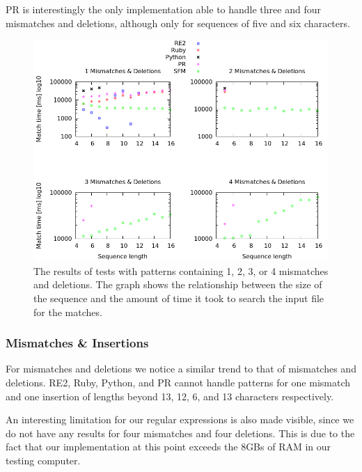\documentclass[12pt]{article}
\theoremstyle{definition}
\begin{document}
PR is interestingly the only implementation able to handle three and four mismatches and deletions, although only for sequences of five and six characters.

\begin{figure}[H]
	\begin{center}
		\includegraphics[scale=0.55]{graphs/mismatches_deletions.png}	
	\end{center}
	\caption{The results of tests with patterns containing 1, 2, 3, or 4 mismatches and deletions. The graph shows the relationship between the size of the sequence and the amount of time it took to search the input file for the matches.}
	\label{graph:mismatches:deletions}
\end{figure}

\subsubsection{Mismatches \& Insertions}

For mismatches and deletions we notice a similar trend to that of mismatches and deletions. RE2, Ruby, Python, and PR cannot handle patterns for one mismatch and one insertion of lengths beyond 13, 12, 6, and 13 characters respectively.

An interesting limitation for our regular expressions is also made visible, since we do not have any results for four mismatches and four deletions. This is due to the fact that our implementation at this point exceeds the 8GBs of RAM in our testing computer. 
\end{document}
